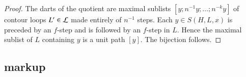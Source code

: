 \begin{proof} The darts of the quotient are maximal sublists
  $[y;n^{-1} y;\ldots;n^{-k} y]$ of contour loops $L'\in {\cal L}$
  made entirely of $n^{-1}$ steps.  Each $y\in S(H,L,x)$ is preceded
  by an $f$-step and is followed by an $f$-step in $L$.  Hence the
  maximal sublist of $L$ containing $y$ is a unit path $[y]$.  The
  bijection follows.
\end{proof}


\subsection{markup}\label{sec:face-insert}
%






